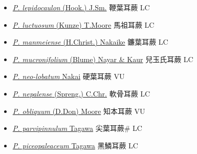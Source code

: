 \begin{itemize}
\begin{itemize}
        \item[] \href{http://www.theplantlist.org/tpl1.1/search?q=Polystichum+lepidocaulon}{\textit{P. lepidocaulon} (Hook.) J.Sm.}   鞭葉耳蕨 LC
        \item[] \href{http://www.theplantlist.org/tpl1.1/search?q=Polystichum+luctuosum}{\textit{P. luctuosum} (Kunze) T.Moore}     馬祖耳蕨 LC
        \item[] \href{http://www.theplantlist.org/tpl1.1/search?q=Polystichum+manmeiense}{\textit{P. manmeiense} (H.Christ.) Nakaike}   鐮葉耳蕨 LC
        \item[] \href{http://www.theplantlist.org/tpl1.1/search?q=Polystichum+mucronifolium}{\textit{P. mucronifolium} (Blume) Nayar \& Kaur}     兒玉氏耳蕨 LC
        \item[] \href{http://www.theplantlist.org/tpl1.1/search?q=Polystichum+neo-lobatum}{\textit{P. neo-lobatum} Nakai}   硬葉耳蕨 VU
        \item[] \href{http://www.theplantlist.org/tpl1.1/search?q=Polystichum+nepalense}{\textit{P. nepalense} (Spreng.) C.Chr.}   軟骨耳蕨 LC
        \item[] \href{http://www.theplantlist.org/tpl1.1/search?q=Polystichum+obliquum}{\textit{P. obliquum} (D.Don) Moore}   知本耳蕨 VU
        \item[] \href{http://www.theplantlist.org/tpl1.1/search?q=Polystichum+parvipinnulum}{\textit{P. parvipinnulum} Tagawa}   尖葉耳蕨\# LC
        \item[] \href{http://www.theplantlist.org/tpl1.1/search?q=Polystichum+piceopaleaceum}{\textit{P. piceopaleaceum} Tagawa}   黑鱗耳蕨 LC

\end{itemize}
\end{itemize}
